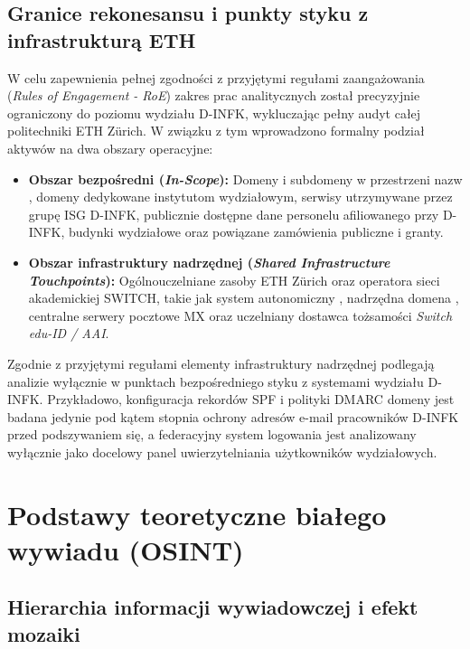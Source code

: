 \subsection{Granice rekonesansu i punkty styku z infrastrukturą ETH}\label{subsec:granice-zakresu}

W celu zapewnienia pełnej zgodności z przyjętymi regułami zaangażowania (\textit{Rules of Engagement - RoE}) zakres prac analitycznych został precyzyjnie ograniczony do poziomu wydziału D-INFK, wykluczając pełny audyt całej politechniki ETH Zürich. W związku z tym wprowadzono formalny podział aktywów na dwa obszary operacyjne:
\begin{itemize}
    \item \textbf{Obszar bezpośredni (\textit{In-Scope}):} Domeny i subdomeny w przestrzeni nazw , domeny dedykowane instytutom wydziałowym, serwisy utrzymywane przez grupę ISG D-INFK, publicznie dostępne dane personelu afiliowanego przy D-INFK, budynki wydziałowe oraz powiązane zamówienia publiczne i granty.
    \item \textbf{Obszar infrastruktury nadrzędnej (\textit{Shared Infrastructure Touchpoints}):} Ogólnouczelniane zasoby ETH Zürich oraz operatora sieci akademickiej SWITCH, takie jak system autonomiczny , nadrzędna domena , centralne serwery pocztowe MX oraz uczelniany dostawca tożsamości \textit{Switch edu-ID / AAI}.
\end{itemize}

Zgodnie z przyjętymi regułami elementy infrastruktury nadrzędnej podlegają analizie wyłącznie w punktach bezpośredniego styku z systemami wydziału D-INFK. Przykładowo, konfiguracja rekordów SPF i polityki DMARC domeny  jest badana jedynie pod kątem stopnia ochrony adresów e-mail pracowników D-INFK przed podszywaniem się, a federacyjny system logowania jest analizowany wyłącznie jako docelowy panel uwierzytelniania użytkowników wydziałowych.

\section{Podstawy teoretyczne białego wywiadu (OSINT)}\label{sec:podstawy-teoretyczne}

\subsection{Hierarchia informacji wywiadowczej i efekt mozaiki}\label{subsec:definicja-osint}

